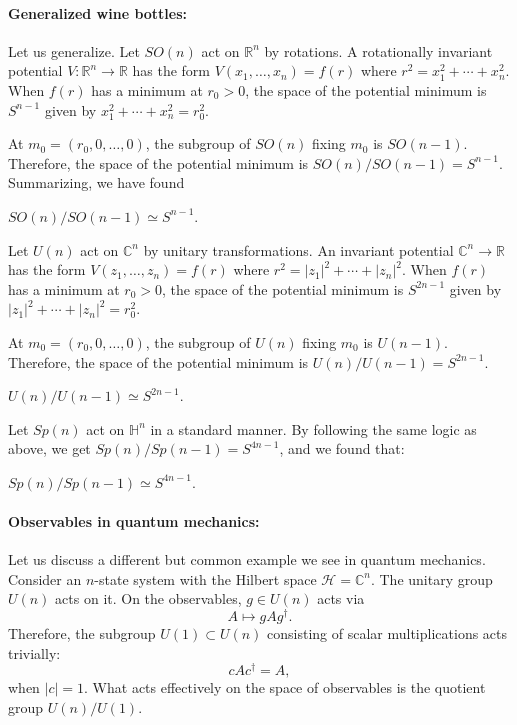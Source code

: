 \documentclass[12pt]{article}
\numberwithin{equation}{section}
\numberwithin{figure}{section}
\theoremstyle{remark}
\def\bC{\mathbb{C}}
\def\bH{\mathbb{H}}
\def\bR{\mathbb{R}}
\def\cH{\mathcal{H}}
\begin{document}
\paragraph{Generalized wine bottles:}
Let us generalize.
Let $SO(n)$ act on $\bR^n$ by rotations.
A rotationally invariant potential $V:\bR^n\to \bR$ 
has the form $V(x_1,\ldots,x_n)=f(r)$ where $r^2={x_1^2+\cdots+x_n^2}$.
When $f(r)$ has a minimum at $r_0>0$,
the space of the potential minimum is $S^{n-1}$ given by $x_1^2+\cdots + x_n^2=r_0^2$.

At $m_0=(r_0,0,\ldots,0)$, the subgroup of $SO(n)$ fixing $m_0$ is $SO(n-1)$.
Therefore, the space of the potential minimum is $SO(n)/SO(n-1)=S^{n-1}$.
Summarizing, we have found
\begin{proposition}
  \label{prop:SO/SO}
 $ SO(n)/SO(n-1) \simeq S^{n-1}$.
\end{proposition}

Let $U(n)$ act on $\bC^n$ by unitary transformations.
An invariant potential $\bC^n\to \bR$ has the form $V(z_1,\ldots,z_n)=f(r)$
where $r^2=|z_1|^2+\cdots+|z_n|^2$.
When $f(r)$ has a minimum at $r_0>0$,
the space of the potential minimum is $S^{2n-1}$ given by $|z_1|^2+\cdots + |z_n|^2=r_0^2$.

At $m_0=(r_0,0,\ldots,0)$, the subgroup of $U(n)$ fixing $m_0$ is $U(n-1)$.
Therefore, the space of the potential minimum is $U(n)/U(n-1)=S^{2n-1}$.
\begin{proposition}
  \label{prop:U/U}
$U(n)/U(n-1)\simeq S^{2n-1}$.
\end{proposition}

Let $Sp(n)$ act on $\bH^n$ in a standard manner.
By following the same logic as above, we get $Sp(n)/Sp(n-1)=S^{4n-1}$,
and we found that:
\begin{proposition}
  \label{prop:Sp/Sp}
$ Sp(n)/Sp(n-1)\simeq S^{4n-1}$.
\end{proposition}

\paragraph{Observables in quantum mechanics:}
Let us discuss a different but common example we see in quantum mechanics.
Consider an $n$-state system with the Hilbert space $\cH=\bC^n$.
The unitary group $U(n)$ acts on it.
On the observables, $g\in U(n)$ acts via \begin{equation}
  A\mapsto g A g^\dagger.
\end{equation}
Therefore, the subgroup $U(1) \subset U(n)$
consisting of scalar multiplications acts trivially: \begin{equation}
c A c^\dagger = A,
\end{equation} when $|c|=1$. 
What acts effectively on the space of observables is the quotient group $U(n)/U(1)$.
\end{document}
